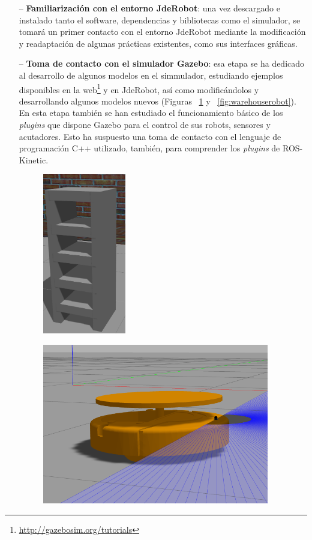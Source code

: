 \begin{itemize}
	\item[--] \textbf{Familiarización con el entorno JdeRobot}: una vez descargado e instalado tanto el software, dependencias y bibliotecas como el simulador, se tomará un primer contacto con el entorno JdeRobot mediante la modificación y readaptación de algunas prácticas existentes, como sus interfaces gráficas.
	\item[--] \textbf{Toma de contacto con el simulador Gazebo}: esa etapa se ha dedicado al desarrollo de algunos modelos en el simmulador, estudiando ejemplos disponibles en la web\footnote{\url{http://gazebosim.org/tutorials}} y en JdeRobot, así como modificándolos y desarrollando algunos modelos nuevos (Figuras ~\ref{fig:estanteria} y ~\ref{fig:warehouserobot}). En esta etapa también se han estudiado el funcionamiento básico de los \textit{plugins} que dispone Gazebo para el control de sus robots, sensores y acutadores. Esto ha suspuesto una toma de contacto con el lenguaje de programación C++ utilizado, también, para comprender los \textit{plugins} de ROS-Kinetic.
\begin{figure}[H]
	\centering
	\begin{minipage}[h]{.48\linewidth}
		\centering
		\includegraphics[width=.5\linewidth, height=7cm]{figures/estanteria.png}
		\label{fig:estanteria}
	\end{minipage}
	\begin{minipage}[H]{.48\linewidth}
		\centering
		\includegraphics[width=.7\linewidth, height=7cm]{figures/warehouse_robot.png}

\end{minipage}
\end{figure}
\end{itemize}
